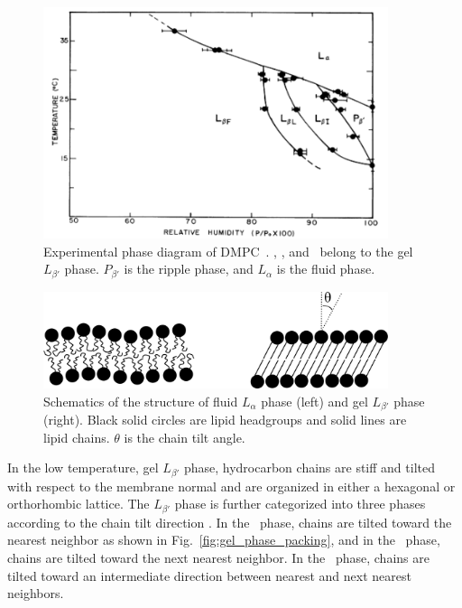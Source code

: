 \begin{figure}[htbp]
  \centering
  \includegraphics[width=0.9\textwidth]{figures/smith_phase_diagram}
  \caption[Experimental phase diagram of DMPC~\cite{ref:Smith88}]
  {Experimental phase diagram of DMPC~\cite{ref:Smith88}.
  \LbetaI, \LbetaL, and \LbetaF\ belong to the gel $L_{\beta'}$ phase. $P_{\beta'}$ is 
  the ripple phase, and $L_\alpha$ is the fluid phase.}
  \label{fig:phase_diagram}
\end{figure}

\begin{figure}[htbp]
  \centering
  \includegraphics[width=0.9\textwidth]{figures/various_phases}
  \caption[Schematics of the structure of fluid $L_\alpha$ phase (left) and 
  gel $L_{\beta'}$ phase (right)]
  {Schematics of the structure of fluid $L_\alpha$ phase (left) and 
  gel $L_{\beta'}$ phase (right). Black solid circles are lipid headgroups 
  and solid lines are lipid chains. $\theta$ is the chain tilt angle.}
  \label{fig:various_phases}
\end{figure}

In the low temperature, gel $L_{\beta'}$
phase, hydrocarbon chains are stiff and tilted with respect to the membrane
normal \cite{ref:Tardieu73} and are organized in either a hexagonal 
or orthorhombic lattice. 
The $L_{\beta'}$ phase is further categorized into three phases according to the 
chain tilt direction \cite{ref:Smith88,ref:Tristram93,Tristram-Nagle02}. 
In the \LbetaI\ phase, chains are tilted toward the 
nearest neighbor as shown in Fig.~\ref{fig:gel_phase_packing}, and
in the \LbetaF\ phase, chains are tilted toward the next nearest neighbor.
In the \LbetaL\ phase, chains are tilted toward an intermediate direction
between nearest and next nearest neighbors.

